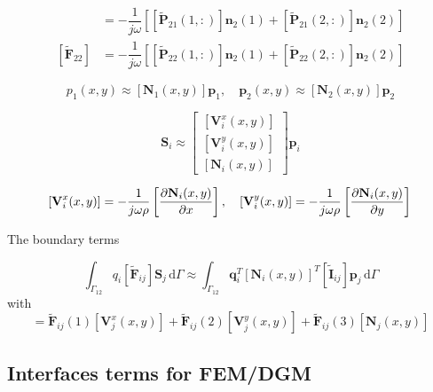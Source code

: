\documentclass[11pt,A4paper]{book}
\newcommand{\ds}{\displaystyle}
\newcommand{\tb}{\textbf}
\newcommand{\tp}{^T}
\newcommand{\esp}{, \quad}
\newcommand{\p}{\partial}
\newcommand{\wdt}[1]{\widetilde{#1}}
\renewcommand{\d}{\,\textrm{d}}
\renewcommand{\:}{\tb{:}}
\begin{document}
\begin{align}
 [\wdt{\tb{F}}_{21}]&=-\dfrac{1}{j\omega}
	\left[[\wdt{\tb{P}}_{21}(1,:)]\tb{n}_2(1)+[\wdt{\tb{P}}_{21}(2,:)]\tb{n}_2(2)\right]\\
	[\wdt{\tb{F}}_{22}]&=-\dfrac{1}{j\omega}
	\left[[\wdt{\tb{P}}_{22}(1,:)]\tb{n}_2(1)+[\wdt{\tb{P}}_{22}(2,:)]\tb{n}_2(2)\right]
\end{align}




\begin{equation}
p_1(x,y)\approx[\tb{N}_1(x,y)]\tb{p}_1 \esp \tb{p}_2(x,y)\approx[\tb{N}_2(x,y)]\tb{p}_2
\end{equation}

\begin{equation}
\tb{S}_i\approx\left[
\begin{array}{c}
\left[\tb{V}_i^x(x,y)\right]\\
\left[\tb{V}_i^y(x,y)\right]\\
\left[\tb{N}_i(x,y)\right]
\end{array}
\right]\tb{p}_i
\end{equation}

\begin{equation}
	\left[\tb{V}_i^x(x,y)\right]=-\dfrac{1}{j\omega \rho}\left[\dfrac{\p \tb{N}_i(x,y)}{\p x}\right]\esp
\left[\tb{V}_i^y(x,y)\right]=
-\dfrac{1}{j\omega \rho}\left[\dfrac{\p \tb{N}_i(x,y)}{\p y}\right]\\
\end{equation}

The boundary terms

\begin{equation}
	\ds{\int_{\Gamma_{12}}} 
q_i [\wdt{\tb{F}}_{ij}]\tb{S}_j
 \d\Gamma \approx \ds{\int_{\Gamma_{12}}} 
\tb{q}_i\tp \left[\tb{N}_i(x,y)\right]
\tp
[\wdt{\tb{I}}_{ij}]
\tb{p}_j
 \d\Gamma 
\end{equation}
with
\begin{equation}
[\wdt{\tb{I}}_{ij}]=	\wdt{\tb{F}}_{ij}(1) \left[\tb{V}_j^x(x,y)\right]+\wdt{\tb{F}}_{ij}(2)\left[\tb{V}_j^y(x,y)\right]+\wdt{\tb{F}}_{ij}(3)\left[\tb{N}_j (x,y)
\right]
\end{equation}







\subsection{Interfaces terms for FEM/DGM}
\end{document}
